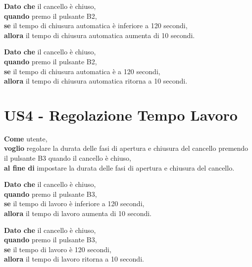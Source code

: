 \begin{tcolorbox}[title={Criterio di Accettazione \#1}, colback=blue!20!white, colframe=blue!80!black]
    \textbf{Dato che} il cancello è chiuso, \\
    \textbf{quando} premo il pulsante B2, \\
    \textbf{se} il tempo di chiusura automatica è inferiore a 120 secondi, \\
    \textbf{allora} il tempo di chiusura automatica aumenta di 10 secondi.
\end{tcolorbox}

\begin{tcolorbox}[title={Criterio di Accettazione \#2}, colback=blue!20!white, colframe=blue!80!black]
    \textbf{Dato che} il cancello è chiuso, \\
    \textbf{quando} premo il pulsante B2, \\
    \textbf{se} il tempo di chiusura automatica è a 120 secondi, \\
    \textbf{allora} il tempo di chiusura automatica ritorna a 10 secondi.
\end{tcolorbox}

\section{US4 - Regolazione Tempo Lavoro}
\begin{tcolorbox}[title={Descrizione}, colback=red!20!white, colframe=red!80!black]
    \textbf{Come} utente, \\
    \textbf{voglio} regolare la durata delle fasi di apertura e chiusura del cancello premendo il pulsante B3 quando il cancello è chiuso, \\
    \textbf{al fine di} impostare la durata delle fasi di apertura e chiusura del cancello.
\end{tcolorbox}

\begin{tcolorbox}[title={Criterio di Accettazione \#1}, colback=blue!20!white, colframe=blue!80!black]
    \textbf{Dato che} il cancello è chiuso, \\
    \textbf{quando} premo il pulsante B3, \\
    \textbf{se} il tempo di lavoro è inferiore a 120 secondi, \\
    \textbf{allora} il tempo di lavoro aumenta di 10 secondi.
\end{tcolorbox}

\begin{tcolorbox}[title={Criterio di Accettazione \#2}, colback=blue!20!white, colframe=blue!80!black]
    \textbf{Dato che} il cancello è chiuso, \\
    \textbf{quando} premo il pulsante B3, \\
    \textbf{se} il tempo di lavoro è 120 secondi, \\
    \textbf{allora} il tempo di lavoro ritorna a 10 secondi.
\end{tcolorbox}

